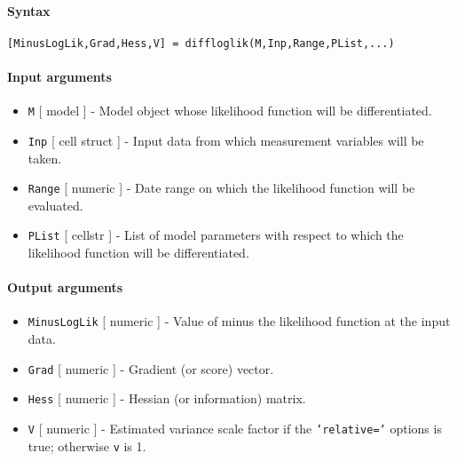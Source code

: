 


	\paragraph{Syntax}\label{syntax}

\begin{verbatim}
[MinusLogLik,Grad,Hess,V] = diffloglik(M,Inp,Range,PList,...)
\end{verbatim}

\paragraph{Input arguments}\label{input-arguments}

\begin{itemize}
\item
  \texttt{M} {[} model {]} - Model object whose likelihood function will
  be differentiated.
\item
  \texttt{Inp} {[} cell \textbar{} struct {]} - Input data from which
  measurement variables will be taken.
\item
  \texttt{Range} {[} numeric {]} - Date range on which the likelihood
  function will be evaluated.
\item
  \texttt{PList} {[} cellstr {]} - List of model parameters with respect
  to which the likelihood function will be differentiated.
\end{itemize}

\paragraph{Output arguments}\label{output-arguments}

\begin{itemize}
\item
  \texttt{MinusLogLik} {[} numeric {]} - Value of minus the likelihood
  function at the input data.
\item
  \texttt{Grad} {[} numeric {]} - Gradient (or score) vector.
\item
  \texttt{Hess} {[} numeric {]} - Hessian (or information) matrix.
\item
  \texttt{V} {[} numeric {]} - Estimated variance scale factor if the
  \texttt{'relative='} options is true; otherwise \texttt{v} is 1.
\end{itemize}

